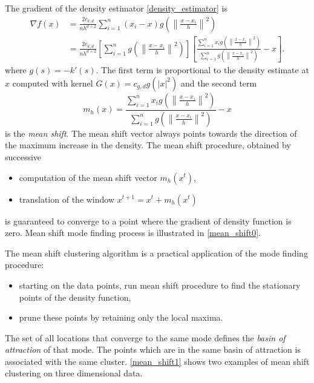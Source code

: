The gradient of the density estimator \eqref{density_estimator} is 
\begin{equation}
	\begin{split}
		\nabla f(x) & = \frac{2c_{k,d}}{nh^{d+2}}\sum_{i=1}^n \left(x_i -
        x\right)g\left(\left\lVert \frac{x - x_i}{h} \right\rVert^2\right) \\ &
        = \frac{2c_{k,d}}{nh^{d+2}} \left[ \sum_{i=1}^n g\left(\left\lVert
        \frac{x - x_i}{h} \right\rVert^2\right) \right] \left[
        \frac{\sum_{i=1}^n x_i g\left(\left\lVert \frac{x - x_i}{h}
        \right\rVert^2\right)}{\sum_{i=1}^n g\left(\left\lVert \frac{x - x_i}{h}
        \right\rVert^2\right)} -x \right].
	\end{split}
\end{equation}
where $g(s) = -k'(s)$. The first term is proportional to the density estimate at
$x$ computed with kernel $G(x) = c_{g,d}g(\lvert x \rvert^2)$ and the second 
term
\begin{equation}
	m_h(x) = \frac{\sum_{i=1}^n x_i g\left(\left\lVert \frac{x - x_i}{h} \right\rVert^2\right)}{\sum_{i=1}^n g\left(\left\lVert \frac{x - x_i}{h} \right\rVert^2\right)} -x
\end{equation}
is the \emph{mean shift}. The mean shift vector always points towards the direction of the maximum increase in the density. The mean shift procedure, obtained by successive
\begin{itemize}
	\item computation of the mean shift vector $m_h(x^t)$,
	\item translation of the window $x^{t+1} = x^t + m_h(x^t)$
\end{itemize}
is guaranteed to converge to a point where the gradient of density function is
zero. Mean shift mode finding process is illustrated in \autoref{mean_shift0}.

The mean shift clustering algorithm is a practical application of the mode
finding procedure:
\begin{itemize}
	\item starting on the data points, run mean shift procedure to find the 
	stationary points of the density function,
	\item prune these points by retaining only the local maxima.
\end{itemize}

The set of all locations that converge to the same mode defines the \emph{basin of attraction} of that mode. The points which are in the same basin of 
attraction is associated with the same cluster. \autoref{mean_shift1} shows two examples of mean shift clustering on three dimensional data.





